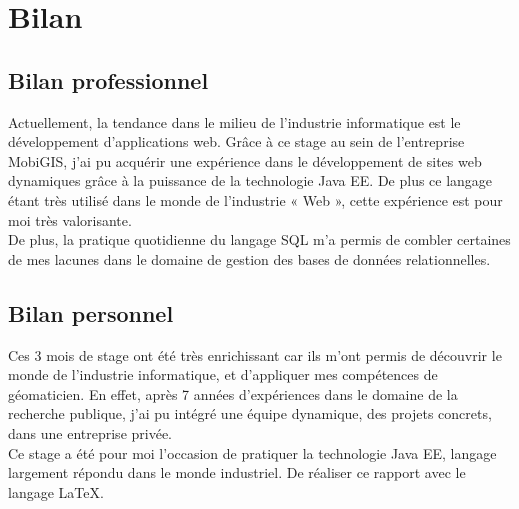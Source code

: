 \chapter{Bilan}
\label{Bilan}


\section{Bilan professionnel}

Actuellement, la tendance dans le milieu de l’industrie informatique est le développement d’applications web. Grâce à ce stage au sein de l’entreprise MobiGIS, j’ai pu acquérir une expérience dans le développement de sites web dynamiques grâce à la puissance de la technologie Java EE. De plus ce langage étant très utilisé dans le monde de l’industrie « Web », cette expérience est pour moi très valorisante.\\
De plus, la pratique quotidienne du langage SQL m’a permis de combler certaines de mes lacunes dans le domaine de gestion des bases de données relationnelles.\\

\section{Bilan personnel}

Ces 3 mois de stage ont été très enrichissant car ils m’ont permis de découvrir le monde de l’industrie informatique, et d'appliquer mes compétences de géomaticien. En effet, après 7 années d'expériences dans le domaine de la recherche publique, j'ai pu intégré une équipe dynamique, des projets concrets, dans une entreprise privée. \\

Ce stage a été pour moi l’occasion de pratiquer la technologie Java EE, langage largement répondu dans le monde industriel. De réaliser ce rapport avec le langage  \LaTeX{}.\\